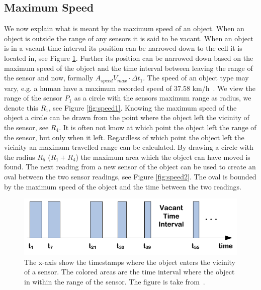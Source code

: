 \subsection{Maximum Speed}
\label{sec:speed}
We now explain what is meant by the maximum speed of an object.
When an object is outside the range of any sensors it is said to be vacant.
When an object is in a vacant time interval its position can be narrowed down to the cell it is located in, see Figure \ref{fig:vacant}. 
Further its position can be narrowed down based on the maximum speed of the object and the time interval between leaving the range of the sensor and now, formally $A_{speed} V_{max}\cdot\Delta t_1$. 
The speed of an object type may vary, e.g. a human have a maximum recorded speed of 37.58 km/h~\cite{bolt}.
We view the range of the sensor $P_1$ as a circle with the sensors maximum range as radius, we denote this $R_1$, see Figure \ref{fig:speed1}.
Knowing the maximum speed of the object a circle can be drawn from the point where the object left the vicinity of the sensor, see $R_4$.
It is often not know at which point the object left the range of the sensor, but only when it left.
Regardless of which point the object left the vicinity an maximum travelled range can be calculated. 
By drawing a circle with the radius $R_5$ ($R_1 + R_4$) the maximum area which the object can have moved is found.  
The next reading from a new sensor of the object can be used to create an oval between the two sensor readings, see Figure \ref{fig:speed2}.  
The oval is bounded by the maximum speed of the object and the time between the two readings. 
\begin{figure}%
\centering
\includegraphics[width=\columnwidth]{images/vacant.png}%
\caption{The x-axis show the timestamps where the object enters the vicinity of a sensor. The colored areas are the time interval where the object in within the range of the sensor. The figure is take from~\cite{Jensen:2009:GMB:1590953.1591000}.}%
\label{fig:vacant}%
\end{figure}
